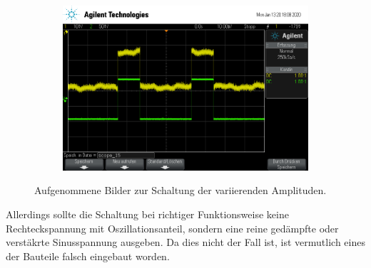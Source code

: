 \begin{figure}[H]
\begin{subfigure}{0.48\textwidth}
                        \label{fig:TU}
                    \end{subfigure}
                    \begin{subfigure}{0.48\textwidth}
                        \centering
                        \includegraphics[width=\textwidth]{scope_15.png}%
                        \label{fig:TU}
                    \end{subfigure}
                \caption{Aufgenommene Bilder zur Schaltung der variierenden Amplituden.}
                \label{fig:vari}
            \end{figure}

            Allerdings sollte die Schaltung bei richtiger Funktionsweise keine Rechteckspannung mit Oszillationsanteil,
            sondern eine reine gedämpfte oder verstäkrte Sinusspannung ausgeben. Da dies nicht der Fall ist, ist vermutlich 
            eines der Bauteile falsch eingebaut worden.
